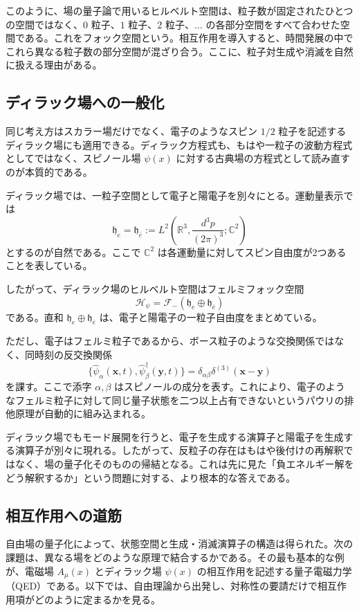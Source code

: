 このように、場の量子論で用いるヒルベルト空間は、粒子数が固定されたひとつの空間ではなく、$0$ 粒子、$1$ 粒子、$2$ 粒子、$\dots$ の各部分空間をすべて合わせた空間である。これをフォック空間という。相互作用を導入すると、時間発展の中でこれら異なる粒子数の部分空間が混ざり合う。ここに、粒子対生成や消滅を自然に扱える理由がある。

\subsection{ディラック場への一般化}
同じ考え方はスカラー場だけでなく、電子のようなスピン $1/2$ 粒子を記述するディラック場にも適用できる。ディラック方程式も、もはや一粒子の波動方程式としてではなく、スピノール場 $\psi(x)$ に対する古典場の方程式として読み直すのが本質的である。

ディラック場では、一粒子空間として電子と陽電子を別々にとる。運動量表示では
\[
\mathfrak{h}_e
=
\mathfrak{h}_{\bar e}
:=
L^2\!\left(\mathbb{R}^3,\frac{d^3p}{(2\pi)^3};\mathbb{C}^2\right)
\]
とするのが自然である。ここで $\mathbb{C}^2$ は各運動量に対してスピン自由度が2つあることを表している。

したがって、ディラック場のヒルベルト空間はフェルミフォック空間
\[
\mathcal{H}_{\psi}
=
\mathcal{F}_-(\mathfrak{h}_e\oplus \mathfrak{h}_{\bar e})
\]
である。直和 $\mathfrak{h}_e\oplus \mathfrak{h}_{\bar e}$ は、電子と陽電子の一粒子自由度をまとめている。

ただし、電子はフェルミ粒子であるから、ボース粒子のような交換関係ではなく、同時刻の反交換関係
\[
\{\hat{\psi}_\alpha(\mathbf{x},t), \hat{\psi}_\beta^\dagger(\mathbf{y},t)\}
= \delta_{\alpha\beta}\delta^{(3)}(\mathbf{x}-\mathbf{y})
\]
を課す。ここで添字 $\alpha,\beta$ はスピノールの成分を表す。これにより、電子のようなフェルミ粒子に対して同じ量子状態を二つ以上占有できないというパウリの排他原理が自動的に組み込まれる。

ディラック場でもモード展開を行うと、電子を生成する演算子と陽電子を生成する演算子が別々に現れる。したがって、反粒子の存在はもはや後付けの再解釈ではなく、場の量子化そのものの帰結となる。これは先に見た「負エネルギー解をどう解釈するか」という問題に対する、より根本的な答えである。

\subsection{相互作用への道筋}
自由場の量子化によって、状態空間と生成・消滅演算子の構造は得られた。次の課題は、異なる場をどのような原理で結合するかである。その最も基本的な例が、電磁場 $A_\mu(x)$ とディラック場 $\psi(x)$ の相互作用を記述する量子電磁力学（QED）である。以下では、自由理論から出発し、対称性の要請だけで相互作用項がどのように定まるかを見る。
